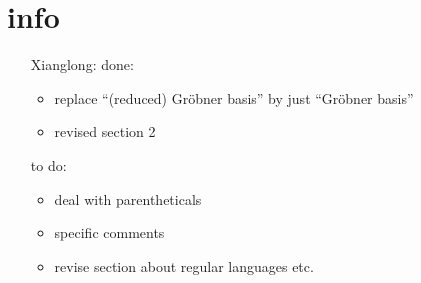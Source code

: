 \section*{info}
\begin{itemize}
	\item[Xianglong:] 
	done:
	\begin{itemize}
		\item replace ``(reduced) Gr\"obner basis'' by just ``Gr\"obner basis''
		\item revised section 2
	\end{itemize}
	to do:
	\begin{itemize}
		\item deal with parentheticals
		\item specific comments
		\item revise section about regular languages etc.
	\end{itemize}
\end{itemize}
\newpage
